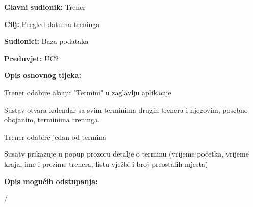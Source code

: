 				
					\noindent {}				\begin{packed_item}
						
						\item \textbf{Glavni sudionik: }Trener
						\item  \textbf{Cilj:} Pregled datuma treninga 
						\item  \textbf{Sudionici:} Baza podataka
						\item  \textbf{Preduvjet:} UC2
						\item  \textbf{Opis osnovnog tijeka:}
						
						\item[] \begin{packed_enum}
							
							\item Trener odabire akciju "Termini" u zaglavlju aplikacije 
							\item Sustav otvara kalendar sa svim terminima drugih trenera i njegovim, posebno obojanim, terminima treninga.
							\item Trener odabire jedan od termina 
							\item Susatv prikazuje u popup prozoru detalje o terminu (vrijeme početka, vrijeme kraja, ime i prezime trenera, listu vježbi i broj preostalih mjesta)

							
						\end{packed_enum}
						
						\item  \textbf{Opis mogućih odstupanja:}
						
						\begin{packed_enum}
							
							\item /
							
						\end{packed_enum}
						
					\end{packed_item}
				

